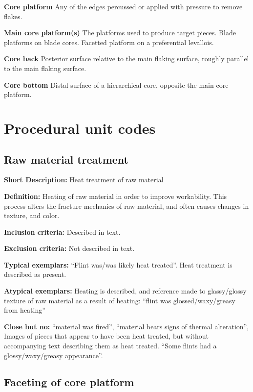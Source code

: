 \documentclass[
]{article}
\begin{document}
\textbf{Core platform} Any of the edges percussed or applied with
pressure to remove flakes.

\textbf{Main core platform(s)} The platforms used to produce target
pieces. Blade platforms on blade cores. Facetted platform on a
preferential levallois.

\textbf{Core back} Posterior surface relative to the main flaking
surface, roughly parallel to the main flaking surface.

\textbf{Core bottom} Distal surface of a hierarchical core, opposite the
main core platform.

\hypertarget{procedural-unit-codes}{%
\section{Procedural unit codes}\label{procedural-unit-codes}}

\hypertarget{raw-material-treatment}{%
\subsection{Raw material treatment}\label{raw-material-treatment}}

\textbf{Short Description:} Heat treatment of raw material

\textbf{Definition:} Heating of raw material in order to improve
workability. This process alters the fracture mechanics of raw material,
and often causes changes in texture, and color.

\textbf{Inclusion criteria:} Described in text.

\textbf{Exclusion criteria:} Not described in text.

\textbf{Typical exemplars:} ``Flint was/was likely heat treated''. Heat
treatment is described as present.

\textbf{Atypical exemplars:} Heating is described, and reference made to
glassy/glossy texture of raw material as a result of heating: ``flint
was glossed/waxy/greasy from heating''

\textbf{Close but no:} ``material was fired'', ``material bears signs of
thermal alteration'', Images of pieces that appear to have been heat
treated, but without accompanying text describing them as heat treated.
``Some flints had a glossy/waxy/greasy appearance''.

\hypertarget{faceting-of-core-platform}{%
\subsection{Faceting of core platform}\label{faceting-of-core-platform}}
\end{document}
